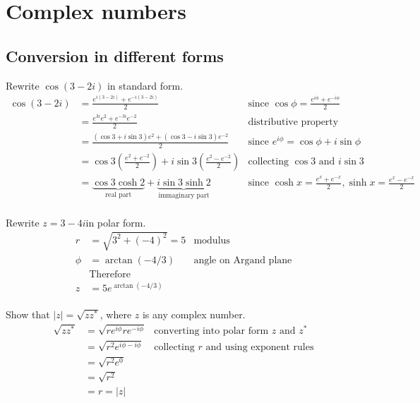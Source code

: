 \section{Complex numbers}

  \subsection{Conversion in different forms}
  Rewrite $\cos(3-2i)$ in standard form.
  \begin{align*}
    \cos(3-2i) & = \frac{e^{i(3-2i)} + e^{-i(3-2i)}}{2}
               & \text{since }\cos\phi = \frac{e^{i\phi} + e^{-i\phi}}{2} \\
               & = \frac{e^{3i}e^{2} + e^{-3i}e^{-2}}{2}
               & \text{distributive property} \\
               & = \frac{(\cos3 + i\sin3)e^{2} + (\cos3 - i\sin3)e^{-2}}{2}
               & \text{since } e^{i\phi} = \cos\phi + i\sin\phi \\
               & = \cos3\left(\frac{e^2+e^{-2}}{2}\right) + i\sin3\left(\frac{e^2-e^{-2}}{2}\right)
               & \text{collecting } \cos3 \text{ and } i\sin3 \\
               & = \underbrace{\cos3\cosh2}_{\text{real part}} + \underbrace{i\sin3\sinh2}_{\text{immaginary part}}
               & \text{since } \cosh x = \frac{e^x+e^{-x}}{2}, \sinh x = \frac{e^x-e^{-x}}{2} \\
  \end{align*}
  
  Rewrite $z = 3 - 4i$in polar form.
  \begin{align*}
    r       & = \sqrt{3^2 + (-4)^2} = 5
            & \text{modulus} \\
    \phi    & = \arctan(-4/3)
            & \text{angle on Argand plane} \\
            & \text{Therefore} \\
    z       & = 5e^{\arctan(-4/3)}\\
  \end{align*}

  Show that $|z| = \sqrt{zz^*}$, where $z$ is any complex number.
  \begin{align*}
    \sqrt{zz^*} & = \sqrt{re^{i\phi}re^{-i\phi}}
                & \text{converting into polar form } z \text{ and } z^* \\
                & = \sqrt{r^2e^{i\phi -i\phi}}
                & \text{collecting } r \text{ and using exponent rules} \\
                & = \sqrt{r^2e^{0}} \\
                & = \sqrt{r^2} \\
                & = r = |z|
  \end{align*}
  
